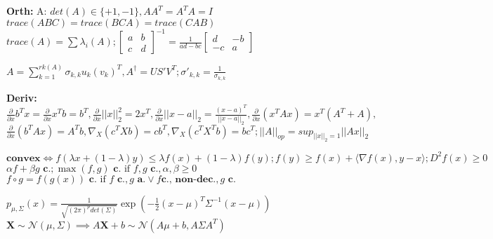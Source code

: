 \textbf{Orth:} A: $det(A)\in\{+1,-1\},AA^T=A^TA=I$\\
\(trace(ABC) = trace(BCA) = trace(CAB)\)\\ 
\(trace(A)=\sum \lambda_i(A);
\begin{bmatrix}
a&b \\ 
c&d
\end{bmatrix}^{-1}=\frac{1}{ad-bc}
\begin{bmatrix}
d&-b \\ 
-c&a
\end{bmatrix}
\)

\(A=\sum_{k=1}^{rk(A)}\sigma_{k,k}u_k (v_k)^T, A^\dag = U S' V^T; \sigma'_{k, k} = \frac{1}{\sigma_{k,k}}\)

\textbf{Deriv:}
$\frac{\partial}{\partial x}b^Tx=\frac{\partial}{\partial x}x^Tb=b^T,\!
\frac{\partial}{\partial x}||x||_2^2=2x^T,\! \frac{\partial}{\partial x} ||x -a||_2 = \frac{(x-a)^T}{||x-a||_2},\!
\frac{\partial}{\partial x}(x^TAx)=x^T(A^T+A),$
$\frac{\partial}{\partial x}(b^TAx)=A^Tb, \nabla_X(c^TXb)=cb^T,
\nabla_X(c^TX^Tb)=bc^T; ||A||_{op} = sup_{||x||_2=1}||Ax||_2$

$\textbf{convex} \iff f(\lambda x+ (1-\lambda)y) \leq \lambda f(x) + (1-\lambda)f(y); 
f(y) \geq f(x) + \langle\nabla f(x), y-x\rangle; D^2f(x) \geq 0$\\
\(\alpha f + \beta g \textbf{ c.}; \max(f, g) \textbf{ c.} \text{ if } f, g \textbf{ c.}, \alpha, \beta \geq 0\)\\
\(f \circ g = f(g(x)) \textbf{ c.} \text{ if } f \textbf{ c.}, g \textbf{ a.} \lor f \textbf{c., non-dec.}, g \textbf{ c.}\)

\(p_{\mu, \Sigma}(x)=\frac{1}{\sqrt{(2\pi)^p det(\Sigma)}}\exp(-\frac{1}{2}(x-\mu)^T\Sigma^{-1}(x-\mu))\)\\
\(\mathbf{X} \sim \mathcal{N}(\mu, \Sigma) \implies A\mathbf{X} + b \sim \mathcal{N}(A\mu+b, A\Sigma A^T)\)

